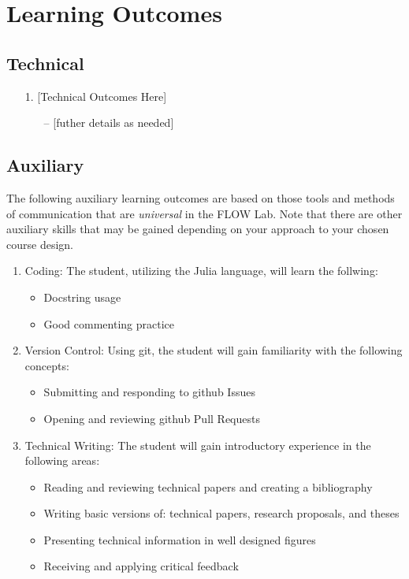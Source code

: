 \documentclass[12pt]{article}
\begin{document}
\section{Learning Outcomes}
\label{sec:learningoutcomes}


\subsection{Technical}
\label{ssec:technicaloutcomes}

\begin{enumerate}
	\item[1.] [Technical Outcomes Here]
	\begin{itemize}
		\item[--] [futher details as needed]
	\end{itemize}
\end{enumerate}


\subsection{Auxiliary}
\label{ssec:auxiliaryoutcomes}

The following auxiliary learning outcomes are based on those tools and methods of communication that are \textit{universal} in the FLOW Lab.  Note that there are other auxiliary skills that may be gained depending on your approach to your chosen course design.

\begin{enumerate}
	\item Coding: The student, utilizing the Julia language, will learn the follwing:
	\begin{itemize}
		\item Docstring usage
		\item Good commenting practice
	\end{itemize}
	\item Version Control: Using git, the student will gain familiarity with the following concepts:
	\begin{itemize}
		\item Submitting and responding to github Issues
		\item Opening and reviewing github Pull Requests
	\end{itemize}
	\item Technical Writing: The student will gain introductory experience in the following areas:
	\begin{itemize}
		\item Reading and reviewing technical papers and creating a bibliography
		\item Writing basic versions of: technical papers, research proposals, and theses
		\item Presenting technical information in well designed figures
		\item Receiving and applying critical feedback
	\end{itemize}
\end{enumerate}
\end{document}
